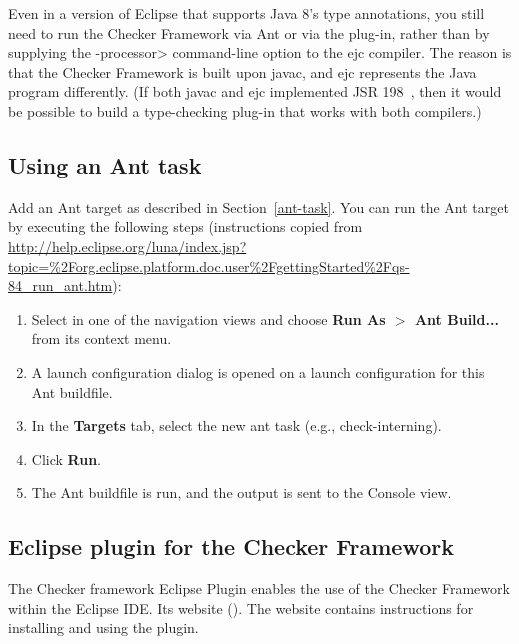 Even in a version of Eclipse that supports Java 8's type annotations, you
still need to run the Checker Framework via Ant or via the plug-in, rather
than by supplying the \<-processor> command-line option to the ejc
compiler.  The reason is that the Checker Framework is built upon javac,
and ejc represents the Java program differently.  (If both javac and ejc
implemented JSR 198~\cite{JSR198}, then it would be possible to build
a type-checking plug-in that works with both compilers.)


\subsection{Using an Ant task\label{eclipse-ant}}

Add an Ant target as described in Section~\ref{ant-task}.  You can
run the Ant target by executing the following steps
(instructions copied from {\codesize\url{http://help.eclipse.org/luna/index.jsp?topic=%2Forg.eclipse.platform.doc.user%2FgettingStarted%2Fqs-84_run_ant.htm}}):

\begin{enumerate}

\item
  Select  in one of the navigation views and choose
  {\bf Run As $>$ Ant Build...} from its context menu.

\item
  A launch configuration dialog is opened on a launch configuration
  for this Ant buildfile.

\item
  In the {\bf Targets} tab, select the new ant task (e.g., check-interning).

\item
  Click {\bf Run}.

\item
  The Ant buildfile is run, and the output is sent to the Console view.

\end{enumerate}


\label{eclipse-plug-in}         %
\subsection{Eclipse plugin for the Checker Framework\label{eclipse-plugin}}

The Checker framework Eclipse Plugin enables the use of the Checker
Framework within the Eclipse IDE\@.
Its website ().
The website contains instructions for installing and using the plugin.


